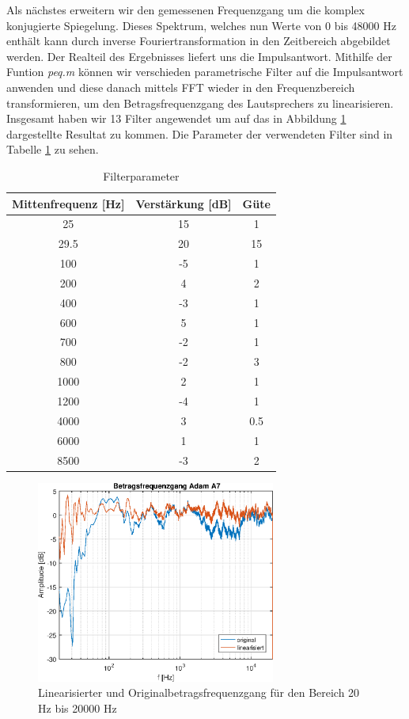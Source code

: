 Als nächstes erweitern wir den gemessenen Frequenzgang um die komplex konjugierte Spiegelung. 
Dieses Spektrum, welches nun Werte von 0 bis 48000 Hz enthält kann durch inverse Fouriertransformation in den Zeitbereich abgebildet werden.
Der Realteil des Ergebnisses liefert uns die Impulsantwort.
Mithilfe der Funtion \textit{peq.m} können wir verschieden parametrische Filter auf die Impulsantwort anwenden und diese danach mittels FFT wieder in den Frequenzbereich transformieren, um den Betragsfrequenzgang des Lautsprechers zu linearisieren.
Insgesamt haben wir 13 Filter angewendet um auf das in Abbildung \ref{fig:frequenzgangA7_lin} dargestellte Resultat zu kommen.
Die Parameter der verwendeten Filter sind in Tabelle \ref{tab:filterparameter} zu sehen.

\begin{table}[H]
    \centering
    \caption{Filterparameter}
    \label{tab:filterparameter}
    \begin{tabular}{| c |c |c |}
    	\hline
        Mittenfrequenz [Hz] & Verstärkung [dB] & Güte\\
        \hline
        25 & 15 & 1 \\
		29.5 & 20 & 15 \\
		100 & -5 & 1\\
		200 & 4 & 2\\
		400 & -3 & 1 \\
		600 & 5 & 1\\
		700 &-2 & 1 \\
		800 & -2 & 3\\
		1000 & 2 & 1\\
		1200 & -4 & 1\\
		4000 & 3 & 0.5\\
		6000 & 1 & 1\\
		8500 & -3 & 2\\
        \hline
    \end{tabular}
\end{table}

\begin{figure}[H]
        \centering
        \includegraphics[width=0.7\textwidth]{Figures/frequenzgangA7_lin.eps}
        \caption{Linearisierter und Originalbetragsfrequenzgang für den Bereich 20 Hz bis 20000 Hz}
        \label{fig:frequenzgangA7_lin}
\end{figure}




